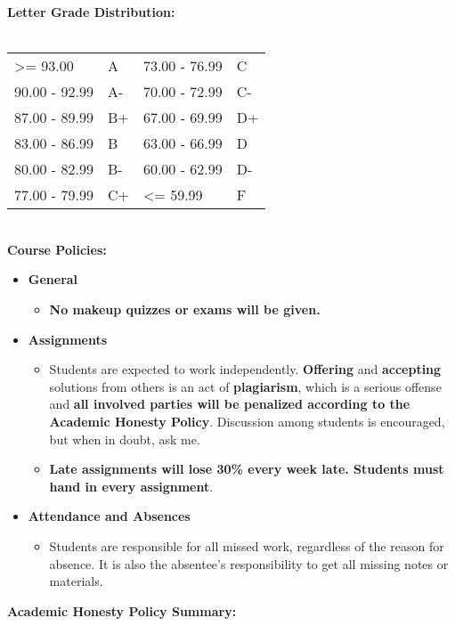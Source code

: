 \documentclass[11pt]{article}
\begin{document}
\textbf {\large Letter Grade Distribution:} \\\\
\hspace*{40mm}
\begin{tabular}{ l l | l l }
\textgreater= 93.00 & A & 73.00 - 76.99 & C \\
90.00 - 92.99 & A-  & 70.00 - 72.99 & C- \\
87.00 - 89.99 & B+  & 67.00 - 69.99 & D+ \\
83.00 - 86.99 & B  & 63.00 - 66.99 & D \\
80.00 - 82.99 & B-  & 60.00 - 62.99 & D- \\
77.00 - 79.99 & C+  & \textless= 59.99 & F \\
\end{tabular} \\

\textbf {\large Course Policies:}
\begin{itemize}
\item \textbf {General}
  \begin{itemize}
  \item \textbf {No makeup quizzes or exams will be given.}
  \end{itemize}
\item \textbf {Assignments}
  \begin{itemize}
  \item Students are expected to work independently. \textbf{Offering}
    and \textbf{accepting} solutions from others is an act of
    \textbf{plagiarism}, which is a serious offense and \textbf{all
      involved parties will be penalized according to the Academic
      Honesty Policy}. Discussion among students is encouraged, but
    when in doubt, ask me.
  \item \textbf{Late assignments will lose 30\% every week late.
    Students must hand in every assignment}.
  \end{itemize}
\item \textbf{Attendance and Absences}
  \begin{itemize}
  \item Students are responsible for all missed work, regardless of
    the reason for absence. It is also the absentee's responsibility
    to get all missing notes or materials.
  \end{itemize}
\end{itemize}

\textbf {\large Academic Honesty Policy Summary:} 
\end{document}
